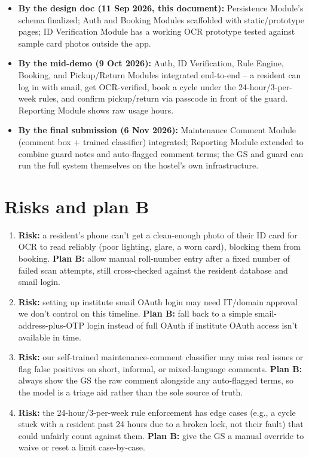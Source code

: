 \documentclass[11pt]{article}
\begin{document}
\begin{itemize}[leftmargin=*]
  \item \textbf{By the design doc (11 Sep 2026, this document):} Persistence Module's schema finalized; Auth and Booking Modules scaffolded with static/prototype pages; ID Verification Module has a working OCR prototype tested against sample card photos outside the app.
  \item \textbf{By the mid-demo (9 Oct 2026):} Auth, ID Verification, Rule Engine, Booking, and Pickup/Return Modules integrated end-to-end -- a resident can log in with smail, get OCR-verified, book a cycle under the 24-hour/3-per-week rules, and confirm pickup/return via passcode in front of the guard. Reporting Module shows raw usage hours.
  \item \textbf{By the final submission (6 Nov 2026):} Maintenance Comment Module (comment box + trained classifier) integrated; Reporting Module extended to combine guard notes and auto-flagged comment terms; the GS and guard can run the full system themselves on the hostel's own infrastructure.
\end{itemize}

\section{Risks and plan B}
\begin{enumerate}[leftmargin=*]
  \item \textbf{Risk:} a resident's phone can't get a clean-enough photo of their ID card for OCR to read reliably (poor lighting, glare, a worn card), blocking them from booking. \textbf{Plan B:} allow manual roll-number entry after a fixed number of failed scan attempts, still cross-checked against the resident database and smail login.
  \item \textbf{Risk:} setting up institute smail OAuth login may need IT/domain approval we don't control on this timeline. \textbf{Plan B:} fall back to a simple smail-address-plus-OTP login instead of full OAuth if institute OAuth access isn't available in time.
  \item \textbf{Risk:} our self-trained maintenance-comment classifier may miss real issues or flag false positives on short, informal, or mixed-language comments. \textbf{Plan B:} always show the GS the raw comment alongside any auto-flagged terms, so the model is a triage aid rather than the sole source of truth.
  \item \textbf{Risk:} the 24-hour/3-per-week rule enforcement has edge cases (e.g., a cycle stuck with a resident past 24 hours due to a broken lock, not their fault) that could unfairly count against them. \textbf{Plan B:} give the GS a manual override to waive or reset a limit case-by-case.
\end{enumerate}
\end{document}
